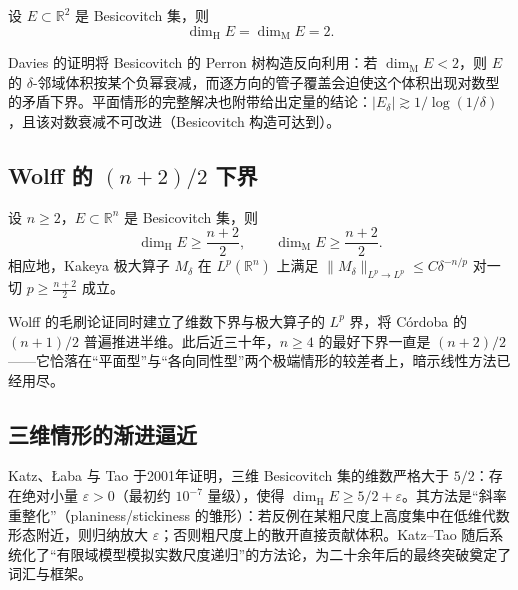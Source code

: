 \begin{theorem}[Davies, 1971]\label{thm:davies}
    设 $E \subset \mathbb{R}^2$ 是 Besicovitch 集，则
    \begin{equation}
        \dim_{\mathrm{H}} E = \dim_{\mathrm{M}} E = 2 .
    \end{equation}
\end{theorem}

Davies 的证明将 Besicovitch 的 Perron 树构造反向利用：若 $\dim_{\mathrm{M}} E < 2$，则 $E$ 的 $\delta$-邻域体积按某个负幂衰减，而逐方向的管子覆盖会迫使这个体积出现对数型的矛盾下界。平面情形的完整解决也附带给出定量的结论：$|E_\delta| \gtrsim 1/\log(1/\delta)$，且该对数衰减不可改进（Besicovitch 构造可达到）。

\subsection{Wolff 的 $(n+2)/2$ 下界}

\begin{theorem}[Wolff, 1995]\label{thm:wolff}
    设 $n \ge 2$，$E \subset \mathbb{R}^n$ 是 Besicovitch 集，则
    \begin{equation}
        \dim_{\mathrm{H}} E \ge \frac{n+2}{2}, \qquad \dim_{\mathrm{M}} E \ge \frac{n+2}{2}.
    \end{equation}
    相应地，Kakeya 极大算子 $M_\delta$ 在 $L^p(\mathbb{R}^n)$ 上满足 $\|M_\delta\|_{L^p \to L^p} \le C \delta^{-n/p}$ 对一切 $p \ge \frac{n+2}{2}$ 成立。
\end{theorem}

Wolff 的毛刷论证同时建立了维数下界与极大算子的 $L^p$ 界，将 Córdoba 的 $(n+1)/2$ 普遍推进半维。此后近三十年，$n \ge 4$ 的最好下界一直是 $(n+2)/2$——它恰落在“平面型”与“各向同性型”两个极端情形的较差者上，暗示线性方法已经用尽。

\subsection{三维情形的渐进逼近}

Katz、\L aba 与 Tao 于2001年证明，三维 Besicovitch 集的维数严格大于 $5/2$\cite{klt2001}：存在绝对小量 $\varepsilon > 0$（最初约 $10^{-7}$ 量级），使得 $\dim_{\mathrm{H}} E \ge 5/2 + \varepsilon$。其方法是“斜率重整化”（planiness/stickiness 的雏形）：若反例在某粗尺度上高度集中在低维代数形态附近，则归纳放大 $\varepsilon$；否则粗尺度上的散开直接贡献体积。Katz--Tao 随后系统化了“有限域模型模拟实数尺度递归”的方法论\cite{katztao2002}，为二十余年后的最终突破奠定了词汇与框架。

